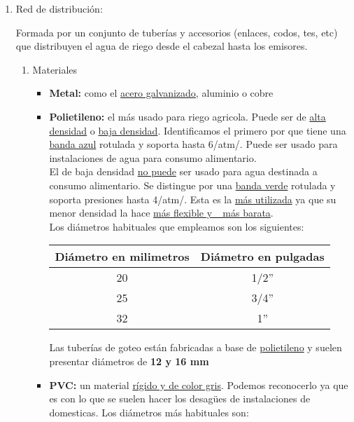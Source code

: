 \documentclass[a4paper,12pt,oneside]{article}
\begin{document}
\begin{enumerate}
\item Red de distribución:
\label{sec:org26e2c60}

Formada por un conjunto de tuberías y accesorios (enlaces, codos, tes, etc) que
distribuyen el agua de riego desde el cabezal hasta los emisores.\\

\begin{enumerate}
\item Materiales
\label{sec:orgbc3b0f3}

\begin{itemize}
\item \textbf{Metal:} como el \uline{acero galvanizado}, aluminio o cobre
\item \textbf{Polietileno:} el más usado para riego agricola. Puede ser de \uline{alta densidad}
o \uline{baja densidad}. Identificamos el primero por que tiene una \uline{banda azul}
rotulada y soporta hasta 6/atm/. Puede ser usado para instalaciones de agua
para consumo alimentario.\\
El de baja densidad \uline{no puede} ser usado para agua destinada a consumo
alimentario. Se distingue por una \uline{banda verde} rotulada y soporta presiones
hasta 4/atm/. Esta es la \uline{más utilizada} ya que su menor densidad la hace \uline{más
flexible y \_más barata}.\\

Los diámetros habituales que empleamos son los siguientes:\\
\begin{table}[h!]
    \centering  
    \begin{tabular}{|c|c|}
    \hline 
    Diámetro en milimetros&Diámetro en pulgadas\\
    \hline
    20&1/2''\\
    \hline
    25&3/4''\\
    \hline
    32&1''\\
    \hline
\end{tabular}
\end{table}
Las tuberías de goteo están fabricadas a base de \uline{polietileno} y suelen
presentar diámetros de \textbf{12 y 16 mm}
\item \textbf{PVC:} un material \uline{rígido y de color gris}. Podemos reconocerlo ya que es con lo
que se suelen hacer los desagües de instalaciones de domesticas. Los diámetros
más habituales son:


\end{itemize}
\end{enumerate}
\end{enumerate}
\end{document}

